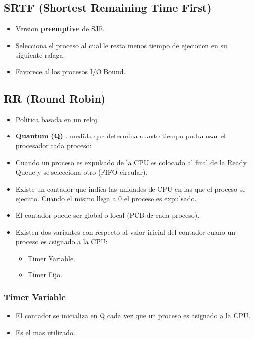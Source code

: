 \documentclass[11pt]{article}
\begin{document}
\subsection{SRTF (Shortest Remaining Time First)}
\begin{itemize}
    \item Version \textbf{preemptive} de SJF.
    \item Selecciona el proceso al cual le resta menos tiempo de ejecucion en su siguiente rafaga.
    \item Favorece al los procesos I/O Bound.
\end{itemize}

\subsection{RR (Round Robin)}
\begin{itemize}
    \item Politica basada en un reloj.
    \item \textbf{Quantum (Q)} : medida que determina cuanto tiempo podra usar el procesador cada proceso:
    \item Cuando un proceso es expulsado de la CPU es colocado al final de la Ready Queue y se selecciona otro (FIFO circular).
    \item Existe un contador que indica las unidades de CPU en las que el proceso se ejecuto. Cuando el mismo llega a 0 el proceso es expulsado.
    \item El contador puede ser global o local (PCB de cada proceso).
    \item Existen dos variantes con respecto al valor inicial del contador cuano un proceso es asignado a la CPU:
        \begin{itemize}
            \item Timer Variable.
            \item Timer Fijo.
        \end{itemize}
\end{itemize}

\subsubsection{Timer Variable}
\begin{itemize}
    \item El contador se inicializa en Q cada vez que un proceso es asignado a la CPU.
    \item Es el mas utilizado.
\end{itemize}
\end{document}
